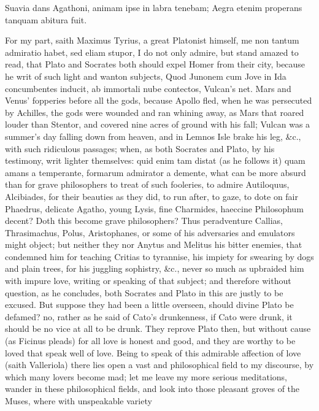 {Suavia dans Agathoni, animam ipse in labra tenebam;
Aegra etenim properans tanquam abitura fuit.

For my part, saith Maximus Tyrius, a great Platonist himself, me
non tantum admiratio habet, sed eliam stupor, I do not only admire, but
stand amazed to read, that Plato and Socrates both should expel Homer
from their city, because he writ of such light and wanton subjects,
Quod Junonem cum Jove in Ida concumbentes inducit, ab immortali nube
contectos, Vulcan's net. Mars and Venus' fopperies before all the gods,
because Apollo fled, when he was persecuted by Achilles, the gods
were wounded and ran whining away, as Mars that roared louder than
Stentor, and covered nine acres of ground with his fall; Vulcan was a
summer's day falling down from heaven, and in Lemnos Isle brake his
leg, \&c., with such ridiculous passages; when, as both Socrates and
Plato, by his testimony, writ lighter themselves: quid enim tam distat
(as he follows it) quam amans a temperante, formarum admirator a
demente, what can be more absurd than for grave philosophers to treat
of such fooleries, to admire Autiloquus, Alcibiades, for their beauties
as they did, to run after, to gaze, to dote on fair Phaedrus, delicate
Agatho, young Lysis, fine Charmides, haeccine Philosophum decent? Doth
this become grave philosophers? Thus peradventure Callias,
Thrasimachus, Polus, Aristophanes, or some of his adversaries and
emulators might object; but neither they nor Anytus and Melitus
his bitter enemies, that condemned him for teaching Critias to
tyrannise, his impiety for swearing by dogs and plain trees, for his
juggling sophistry, \&c., never so much as upbraided him with impure
love, writing or speaking of that subject; and therefore without
question, as he concludes, both Socrates and Plato in this are justly
to be excused. But suppose they had been a little overseen, should
divine Plato be defamed? no, rather as he said of Cato's drunkenness,
if Cato were drunk, it should be no vice at all to be drunk. They
reprove Plato then, but without cause (as Ficinus pleads) for all
love is honest and good, and they are worthy to be loved that speak
well of love. Being to speak of this admirable affection of love (saith
Valleriola) there lies open a vast and philosophical field to my
discourse, by which many lovers become mad; let me leave my more
serious meditations, wander in these philosophical fields, and look
into those pleasant groves of the Muses, where with unspeakable variety
}

